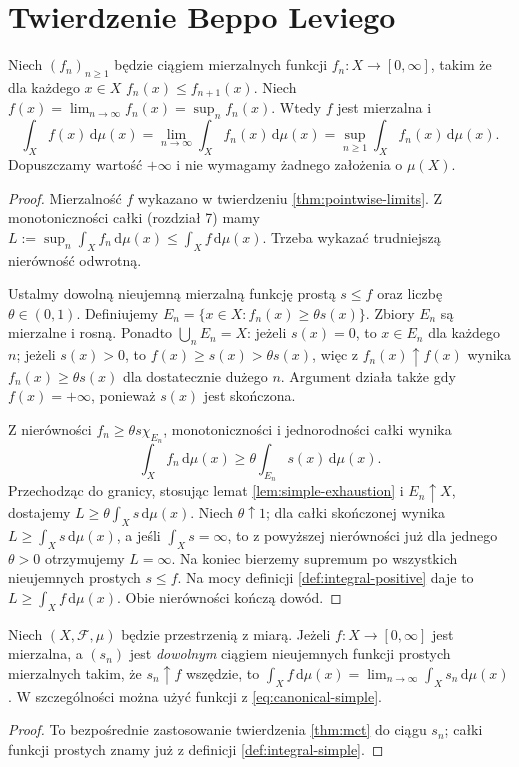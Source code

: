 \section{Twierdzenie Beppo Leviego}

\begin{twierdzenie}
\label{thm:mct}
Niech $(f_n)_{n\ge1}$ będzie ciągiem mierzalnych funkcji
$f_n:X\to[0,\infty]$, takim że dla każdego $x\in X$
$f_n(x)\le f_{n+1}(x)$. Niech
$f(x)=\lim_{n\to\infty}f_n(x)=\sup_nf_n(x)$.
Wtedy $f$ jest mierzalna i
\begin{equation}\label{eq:mct}
\int_Xf(x)\,\mathrm d\mu(x)
=\lim_{n\to\infty}\int_Xf_n(x)\,\mathrm d\mu(x)
=\sup_{n\ge1}\int_Xf_n(x)\,\mathrm d\mu(x).
\end{equation}
Dopuszczamy wartość $+\infty$ i nie wymagamy
żadnego założenia o $\mu(X)$.
\end{twierdzenie}
\begin{proof}
Mierzalność $f$ wykazano w twierdzeniu
\ref{thm:pointwise-limits}. Z monotoniczności całki
(rozdział 7) mamy
$L:=\sup_n\int_Xf_n\,\mathrm d\mu(x)\le
\int_Xf\,\mathrm d\mu(x)$.
Trzeba wykazać trudniejszą nierówność odwrotną.

Ustalmy dowolną nieujemną mierzalną funkcję prostą
$s\le f$ oraz liczbę $\theta\in(0,1)$.
Definiujemy
$E_n=\{x\in X:f_n(x)\ge\theta s(x)\}$.
Zbiory $E_n$ są mierzalne i rosną.
Ponadto $\bigcup_nE_n=X$: jeżeli $s(x)=0$,
to $x\in E_n$ dla każdego $n$; jeżeli $s(x)>0$,
to $f(x)\ge s(x)>\theta s(x)$, więc z
$f_n(x)\uparrow f(x)$ wynika $f_n(x)\ge\theta s(x)$
dla dostatecznie dużego $n$. Argument działa także
gdy $f(x)=+\infty$, ponieważ $s(x)$ jest skończona.

Z nierówności $f_n\ge\theta s\chi_{E_n}$,
monotoniczności i jednorodności całki wynika
\[
\int_Xf_n\,\mathrm d\mu(x)\ge
\theta\int_{E_n}s(x)\,\mathrm d\mu(x).
\]
Przechodząc do granicy, stosując lemat
\ref{lem:simple-exhaustion} i $E_n\uparrow X$,
dostajemy $L\ge\theta\int_Xs\,\mathrm d\mu(x)$.
Niech $\theta\uparrow1$; dla całki skończonej
wynika $L\ge\int_Xs\,\mathrm d\mu(x)$, a jeśli
$\int_Xs=\infty$, to z powyższej nierówności
już dla jednego $\theta>0$ otrzymujemy $L=\infty$.
Na koniec bierzemy supremum po wszystkich
nieujemnych prostych $s\le f$. Na mocy definicji
\ref{def:integral-positive} daje to
$L\ge\int_Xf\,\mathrm d\mu(x)$. Obie nierówności
kończą dowód.
\end{proof}

\begin{wniosek}
\label{cor:simple-approx-integral}
Niech $(X,\mathcal F,\mu)$ będzie przestrzenią z miarą.
Jeżeli $f:X\to[0,\infty]$ jest mierzalna, a
$(s_n)$ jest \emph{dowolnym} ciągiem nieujemnych
funkcji prostych mierzalnych takim, że $s_n\uparrow f$
wszędzie, to
$\int_Xf\,\mathrm d\mu(x)=
\lim_{n\to\infty}\int_Xs_n\,\mathrm d\mu(x)$.
W szczególności można użyć funkcji z
\eqref{eq:canonical-simple}.
\end{wniosek}
\begin{proof}
To bezpośrednie zastosowanie twierdzenia
\ref{thm:mct} do ciągu $s_n$; całki funkcji prostych
znamy już z definicji \ref{def:integral-simple}.
\end{proof}

